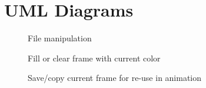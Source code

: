 \documentclass[11pt]{article} %
\begin{document}
\newpage
\section{UML Diagrams}

\begin{figure}[H]
	\centering
	\caption{File manipulation}
	\label{fig:UC1}
\end{figure}
\begin{figure}[H]
	\centering
	\caption{Fill or clear frame with current color}
	\label{fig:UC2}
\end{figure}
\begin{figure}[H]
	\centering
	\caption{Save/copy current frame for re-use in animation}
	\label{fig:UC3}
\end{figure}
\end{document}

